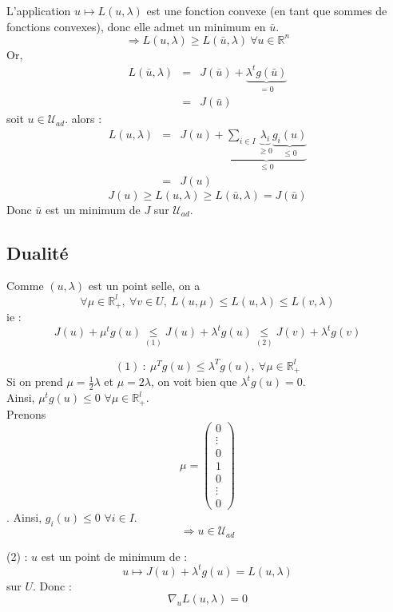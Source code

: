 \begin{dem}
L'application $u\mapsto L(u,\lambda)$ est une fonction convexe (en tant que sommes de fonctions convexes), donc elle admet un minimum en $\bar{u}$.
\[\Rightarrow L(u,\lambda)\geq L(\bar{u},\lambda)\ \forall u\in\mathbb{R}^n\]
Or, \begin{eqnarray*}
L(\bar{u},\lambda)&=&J(\bar{u})+\underbrace{\lambda^t g(\bar{u})}_{=0} \\
		&=&J(\bar{u})
\end{eqnarray*}
soit $u\in\mathcal{U}_{ad}$. alors :
\begin{eqnarray*}
L(u,\lambda)&=&J(u)+\underbrace{\sum_{i\in I} \underbrace{\lambda_i}_{\geq 0} \underbrace{g_i(u)}_{\leq 0}}_{\leq 0}\\
	&=&J(u)
\end{eqnarray*}
\[J(u)\geq L(u,\lambda)\geq L(\bar{u},\lambda)=J(\bar{u})\]
Donc $\bar{u}$ est un minimum de $J$ sur $\mathcal{U}_{ad}$.
\end{dem}

\subsection{Dualité}


\begin{dem}
Comme $(u,\lambda)$ est un point selle, on a 
\[\forall \mu\in\mathbb{R}^l_+,\ \forall v\in U,\ L(u,\mu)\leq L(u,\lambda)\leq L(v,\lambda)\]
ie :
\[J(u)+\mu^tg(u)\underset{(1)}{\leq} J(u)+\lambda^tg(u) \underset{(2)}{\leq} J(v)+\lambda^tg(v)\]

\[(1)\ :\ \mu^Tg(u)\leq \lambda^Tg(u),\ \forall \mu\in\mathbb{R}^l_+\]
Si on prend $\mu=\frac{1}{2}\lambda$ et $\mu=2\lambda$, on voit bien que $\lambda^tg(u)=0$.\\
Ainsi, $\mu^tg(u)\leq 0$ $\forall\mu\in\mathbb{R}^l_+$.\\
Prenons \[\mu=\begin{pmatrix} 0 \\ \vdots \\ 0 \\ 1 \\ 0 \\ \vdots \\ 0 \end{pmatrix}\]. Ainsi, $g_i(u)\leq 0$ $\forall i\in I$.
\[\Rightarrow u\in\mathcal{U}_{ad}\]

(2) : $u$ est un point de minimum de :
\[u\mapsto J(u)+\lambda^tg(u)=L(u,\lambda)\]
sur $U$. Donc :
\[\nabla_u L(u,\lambda)=0\]
\end{dem}

